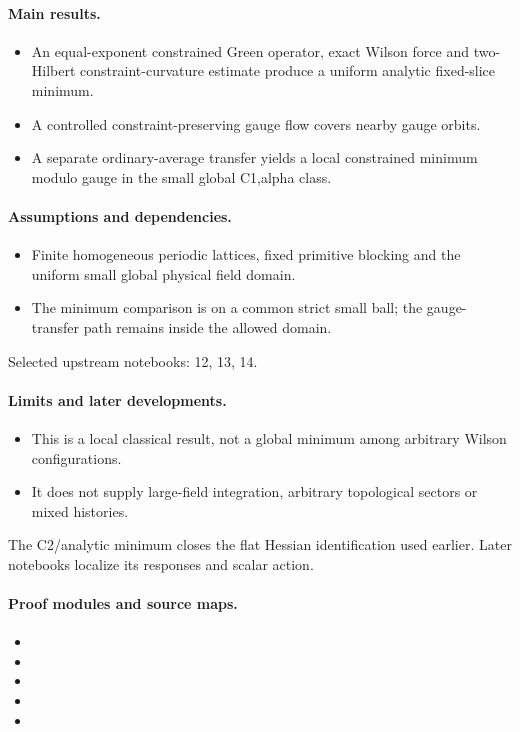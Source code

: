\documentclass[11pt]{article}
\theoremstyle{remark}
\begin{document}
\paragraph{Main results.}
\begin{itemize}
\item An equal-exponent constrained Green operator, exact Wilson force and two-Hilbert constraint-curvature estimate produce a uniform analytic fixed-slice minimum.
\item A controlled constraint-preserving gauge flow covers nearby gauge orbits.
\item A separate ordinary-average transfer yields a local constrained minimum modulo gauge in the small global C1,alpha class.
\end{itemize}

\paragraph{Assumptions and dependencies.}
\begin{itemize}
\item Finite homogeneous periodic lattices, fixed primitive blocking and the uniform small global physical field domain.
\item The minimum comparison is on a common strict small ball; the gauge-transfer path remains inside the allowed domain.
\end{itemize}

Selected upstream notebooks: 12, 13, 14.\par

\paragraph{Limits and later developments.}
\begin{itemize}
\item This is a local classical result, not a global minimum among arbitrary Wilson configurations.
\item It does not supply large-field integration, arbitrary topological sectors or mixed histories.
\end{itemize}

The C2/analytic minimum closes the flat Hessian identification used earlier. Later notebooks localize its responses and scalar action.

\paragraph{Proof modules and source maps.}
\begingroup\small
\begin{itemize}
\item {}
\item {}
\item {}
\item {}
\item {}
\end{itemize}
\endgroup
\end{document}
